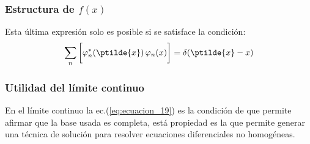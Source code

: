 \begin{frame}
\frametitle{Estructura de $f(x)$}
Esta última expresión solo es posible si se satisface la condición:
\begin{align}
\sum_{n} \bigg[ \varphi_{n}^{*}(\ptilde{x}) \, \varphi_{n}(x) \bigg] = \delta(\ptilde{x} - x)
\label{eq:ecuacion_20}
\end{align}
\end{frame}
\begin{frame}
\frametitle{Utilidad del límite continuo}
En el límite continuo la ec.(\ref{eq:ecuacion_19}) es la condición de que permite afirmar que la base usada es completa, está propiedad es la que permite generar una técnica de solución para resolver ecuaciones diferenciales no homogéneas.
\end{frame}
